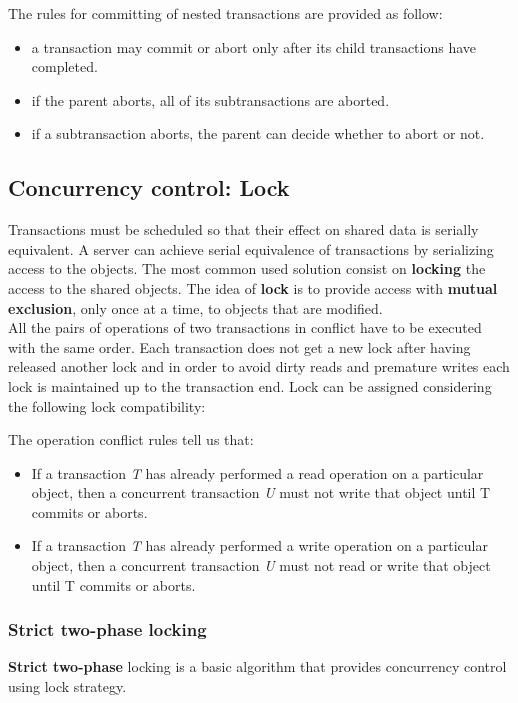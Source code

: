 The rules for committing of nested transactions are provided as follow:
\begin{itemize}
	\item a transaction may commit or abort only after its child transactions have completed.
	\item if the parent aborts, all of its subtransactions are aborted.
	\item if a subtransaction aborts, the parent can decide whether to abort or not.
\end{itemize}

\subsection{Concurrency control: Lock}
Transactions must be scheduled so that their effect on shared data is serially equivalent. A server can achieve serial equivalence of transactions by serializing access to the objects. The most common used solution consist on \textbf{locking} the access to the shared objects. The idea of \textbf{lock} is to provide access with \textbf{mutual exclusion}, only once at a time, to objects that are modified. \\

All the pairs of operations of two transactions in conflict have to be executed with the same order. Each transaction does not get a new lock after having released another lock and in order to avoid dirty reads and premature writes each lock is maintained up to the transaction end. Lock can be assigned considering the following lock compatibility:


The operation conflict rules tell us that:
\begin{itemize}
	\item If a transaction \textit{T} has already performed a read operation on a particular object, then a concurrent transaction \textit{U} must not write that object until T commits or aborts.
	\item If a transaction \textit{T} has already performed a write operation on a particular object, then a concurrent transaction \textit{U} must not read or write that object until T commits or aborts.
\end{itemize}

\subsubsection{Strict two-phase locking}
\textbf{Strict two-phase} locking is a basic algorithm that provides concurrency control using lock strategy.\\

